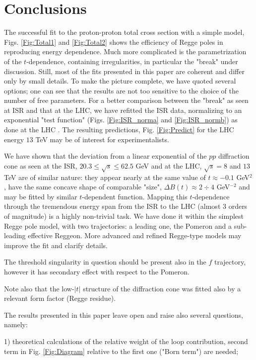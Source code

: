 \documentclass[aps,prd,superscriptaddress,showpacs,preprintnumbers]{revtex4}
\begin{document}
\section{Conclusions} \label{Sec:Conclude}
The successful fit to the proton-proton total cross section with a simple model, Figs. \ref{Fig:Total1} and \ref{Fig:Total2} shows the efficiency of Regge poles in reproducing energy dependence. Much more complicated is the parametrization of the $t$-dependence, containing irregularities, in particular the "break" under discussion. Still, most of the fits presented in this paper are coherent and differ only by small details. To make the picture complete, we have quoted several options; one can see that the results are not too sensitive to the choice of the number of free parameters. For a better comparison between the "break" as seen at ISR and that at the LHC, we have refitted the ISR data, normalizing to an exponential "test function" (Figs. \ref{Fig:ISR_norma} and \ref{Fig:ISR_normb}) as done at the LHC \cite{TOTEM8, TOTEM13}. The resulting predictions, Fig. \ref{Fig:Predict} for the LHC energy $13$ TeV may be of interest for experimentalists.  

We have shown that the deviation from a linear exponential of the $pp$ diffraction cone as seen at the ISR, $20.3\leq\sqrt s\leq 62.5$ GeV and at the LHC, $\sqrt s=8$ and $13$ TeV are of  similar nature: they appear nearly at the same value of $t\approx -0.1$ GeV$^2$, have the same concave shape of comparable "size", $\Delta B(t)\approx 2\div 4$ GeV$^{-2}$ and may be fitted by similar $t$-dependent function. Mapping this $t$-dependence through the tremendous energy span from the ISR to the LHC (almost 3 orders of magnitude) is a highly non-trivial task. We have done it within the simplest Regge pole model, with two trajectories: a leading one, the Pomeron and a sub-leading effective Reggeon. More advanced and refined Regge-type models may improve the fit and clarify details.   
    
The threshold singularity in question should be present also in the $f$ trajectory, however it has secondary effect with respect to the Pomeron. 

Note also that the low-$|t|$ structure of the diffraction cone was fitted also \cite{Lia} by a relevant form factor (Regge residue).

The results presented in this paper leave open and raise also several questions, namely:

1) theoretical calculations of the relative weight of the loop contribution, second term in Fig. \ref{Fig:Diagram} relative to the first one ("Born term") are needed; 
\end{document}
